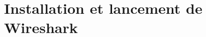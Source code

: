 \chapter{Installation et lancement de Wireshark}
\begin{onehalfspace}


\vspace{1\baselineskip}








\end{onehalfspace}